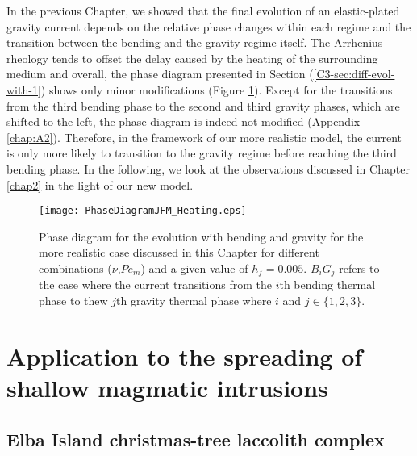 In the  previous Chapter,  we showed  that the  final evolution  of an
elastic-plated gravity  current depends on the  relative phase changes
within  each regime  and the  transition between  the bending  and the
gravity regime  itself.  The  Arrhenius rheology  tends to  offset the
delay caused by the heating of the surrounding medium and overall, the
phase  diagram  presented in  Section  (\ref{C3-sec:diff-evol-with-1})
shows         only         minor         modifications         (Figure
\ref{C4-Phase_Diagram_Heating}).  Except for  the transitions from the
third bending phase to the second  and third gravity phases, which are
shifted  to  the  left,  the  phase diagram  is  indeed  not  modified
(Appendix  \ref{chap:A2}). Therefore,  in  the framework  of our  more
realistic model, the current is only  more likely to transition to the
gravity  regime  before reaching  the  third  bending phase.   In  the
following,  we   look  at   the  observations  discussed   in  Chapter
\ref{chap2} in the light of our new model.

\begin{figure}[h!]
  \begin{center}
    \graphicspath{ {/Users/thorey/Documents/These/Projet/Refroidissement/Skin_Model/Figure/Figure_Heating/} }
    \texttt{[image: PhaseDiagramJFM\_Heating.eps]}
    \caption{Phase diagram for the  evolution with bending and gravity
      for  the  more realistic  case  discussed  in this  Chapter  for
      different  combinations  ($\nu$,$Pe_m$)  and a  given  value  of
      $h_f =  0.005$.  $B_iG_j$ refers  to the case where  the current
      transitions from the  $i$th bending thermal phase  to thew $j$th
      gravity thermal phase where $i$ and $j \in \{1,2,3\}$.}
    \label{C4-Phase_Diagram_Heating}
  \end{center}
\end{figure}

\section{Application to the spreading of shallow magmatic intrusions}
\label{C4-sec:appl-spre-shall}

\subsection{Elba Island christmas-tree laccolith complex}
\label{C4-sec:appl-arrest-terr}

